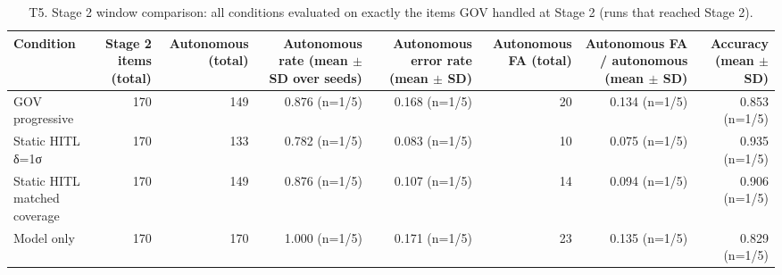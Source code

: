\begin{table}[t]\centering\small
\caption{T5. Stage 2 window comparison: all conditions evaluated on exactly the items GOV handled at Stage 2 (runs that reached Stage 2).}
\label{tab:T5_stage2_window}
\begin{tabular}{lrrrrrrr}\hline
Condition & Stage 2 items (total) & Autonomous (total) & Autonomous rate (mean $\pm$ SD over seeds) & Autonomous error rate (mean $\pm$ SD) & Autonomous FA (total) & Autonomous FA / autonomous (mean $\pm$ SD) & Accuracy (mean $\pm$ SD) \\ \hline
GOV progressive & 170 & 149 & 0.876 (n=1/5) & 0.168 (n=1/5) & 20 & 0.134 (n=1/5) & 0.853 (n=1/5) \\
Static HITL δ=1σ & 170 & 133 & 0.782 (n=1/5) & 0.083 (n=1/5) & 10 & 0.075 (n=1/5) & 0.935 (n=1/5) \\
Static HITL matched coverage & 170 & 149 & 0.876 (n=1/5) & 0.107 (n=1/5) & 14 & 0.094 (n=1/5) & 0.906 (n=1/5) \\
Model only & 170 & 170 & 1.000 (n=1/5) & 0.171 (n=1/5) & 23 & 0.135 (n=1/5) & 0.829 (n=1/5) \\
\hline\end{tabular}
\end{table}
